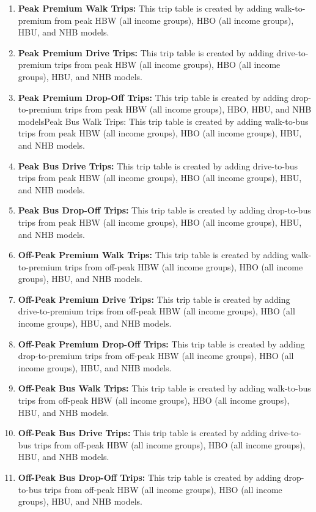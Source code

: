 \documentclass[
]{article}
\begin{document}
\begin{enumerate}
\def\labelenumi{\arabic{enumi}.}
\item
  \textbf{Peak Premium Walk Trips:} This trip table is created by adding
  walk-to-premium from peak HBW (all income groups), HBO (all income
  groups), HBU, and NHB models.
\item
  \textbf{Peak Premium Drive Trips:} This trip table is created by
  adding drive-to-premium trips from peak HBW (all income groups), HBO
  (all income groups), HBU, and NHB models.
\item
  \textbf{Peak Premium Drop-Off Trips:} This trip table is created by
  adding drop-to-premium trips from peak HBW (all income groups), HBO,
  HBU, and NHB modelsPeak Bus Walk Trips: This trip table is created by
  adding walk-to-bus trips from peak HBW (all income groups), HBO (all
  income groups), HBU, and NHB models.
\item
  \textbf{Peak Bus Drive Trips:} This trip table is created by adding
  drive-to-bus trips from peak HBW (all income groups), HBO (all income
  groups), HBU, and NHB models.
\item
  \textbf{Peak Bus Drop-Off Trips:} This trip table is created by adding
  drop-to-bus trips from peak HBW (all income groups), HBO (all income
  groups), HBU, and NHB models.
\item
  \textbf{Off-Peak Premium Walk Trips:} This trip table is created by
  adding walk-to-premium trips from off-peak HBW (all income groups),
  HBO (all income groups), HBU, and NHB models.
\item
  \textbf{Off-Peak Premium Drive Trips:} This trip table is created by
  adding drive-to-premium trips from off-peak HBW (all income groups),
  HBO (all income groups), HBU, and NHB models.
\item
  \textbf{Off-Peak Premium Drop-Off Trips:} This trip table is created
  by adding drop-to-premium trips from off-peak HBW (all income groups),
  HBO (all income groups), HBU, and NHB models.
\item
  \textbf{Off-Peak Bus Walk Trips:} This trip table is created by adding
  walk-to-bus trips from off-peak HBW (all income groups), HBO (all
  income groups), HBU, and NHB models.
\item
  \textbf{Off-Peak Bus Drive Trips:} This trip table is created by
  adding drive-to-bus trips from off-peak HBW (all income groups), HBO
  (all income groups), HBU, and NHB models.
\item
  \textbf{Off-Peak Bus Drop-Off Trips:} This trip table is created by
  adding drop-to-bus trips from off-peak HBW (all income groups), HBO
  (all income groups), HBU, and NHB models.
\end{enumerate}
\end{document}
